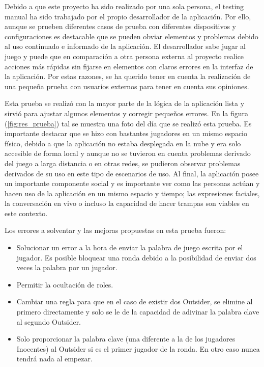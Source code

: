 Debido a que este proyecto ha sido realizado por una sola persona, el testing manual ha sido trabajado por el propio desarrollador de la aplicación.
Por ello, aunque se prueben diferentes casos de prueba con diferentes dispositivos y configuraciones es destacable que se pueden obviar elementos y problemas
debido al uso continuado e informado de la aplicación. El desarrollador sabe jugar al juego y puede que en comparación a otra persona externa al 
proyecto realice acciones más rápidas sin fijarse en elementos con claros errores en la interfaz de la aplicación. Por estas razones, se ha querido tener
en cuenta la realización de una pequeña prueba con usuarios externos para tener en cuenta sus opiniones.

Esta prueba se realizó con la mayor parte de la lógica de la aplicación lista y sirvió para ajustar algunos elementos y corregir pequeños errores.
En la figura (\ref{fig:res_prueba}) tal se muestra una foto del día que se realizó esta prueba. Es importante destacar que se hizo con bastantes jugadores en un mismo
espacio físico, debido a que la aplicación no estaba desplegada en la nube y era solo accesible de forma local y aunque no se tuvieron en cuenta problemas derivado
del juego a larga distancia o en otras redes, se pudieron observar problemas derivados de su uso en este tipo de escenarios de uso. Al final, la 
aplicación posee un importante componente social y es importante ver como las personas actúan y hacen uso de la aplicación en un mismo espacio y tiempo; las
expresiones faciales, la conversación en vivo o incluso la capacidad de hacer trampas son viables en este contexto.

Los errores a solventar y las mejoras propuestas en esta prueba fueron:

\begin{itemize}
	\item Solucionar un error a la hora de enviar la palabra de juego escrita por el jugador. Es posible bloquear una ronda debido a la posibilidad de enviar dos veces
	 	  la palabra por un jugador.
	\item Permitir la ocultación de roles.
	\item Cambiar una regla para que en el caso de existir dos Outsider, se elimine al primero directamente y solo se le de la capacidad de adivinar
		  la palabra clave al segundo Outsider.
	\item Solo proporcionar la palabra clave (una diferente a la de los jugadores Inocentes) al Outsider si es el primer jugador de la ronda. 
		  En otro caso nunca tendrá nada al empezar.
\end{itemize}

